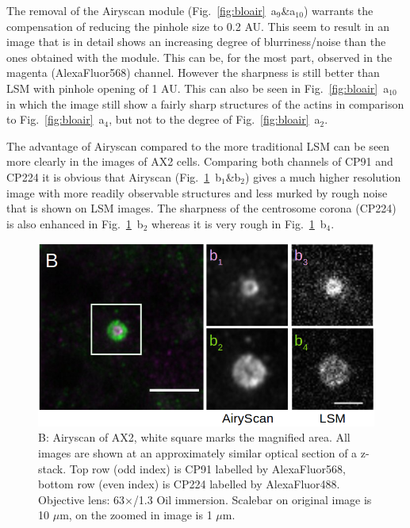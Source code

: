 The removal of the Airyscan module (Fig.~\ref{fig:bloair}~a$_{9}$\&a$_{10}$) warrants the compensation of reducing the pinhole size to 0.2 AU. 
This seem to result in an image that is in detail shows an increasing degree of blurriness/noise than the ones obtained with the module. 
This can be, for the most part, observed in the magenta (AlexaFluor568) channel. 
However the sharpness is still better than LSM with pinhole opening of 1 AU. 
This can also be seen in Fig.~\ref{fig:bloair}~a$_{10}$ in which the image still show a fairly sharp structures of the actins in comparison to Fig.~\ref{fig:bloair}~a$_{4}$, but not to the degree of Fig.~\ref{fig:bloair}~a$_{2}$.  

The advantage of Airyscan compared to the more traditional LSM can be seen more clearly in the images of AX2 cells. 
Comparing both channels of CP91 and CP224 it is obvious that Airyscan (Fig.~\ref{fig:dicair}~b$_{1}$\&b$_{2}$) gives a much higher resolution image with more readily observable structures and less murked by rough noise that is shown on LSM images. 
The sharpness of the centrosome corona (CP224) is also enhanced in Fig.~\ref{fig:dicair}~b$_{2}$ whereas it is very rough in Fig.~\ref{fig:dicair}~b$_{4}$.

\begin{figure}[h!]
\centering
\includegraphics[width=.9\columnwidth]{Exp_6_Airyscan/Figures/DictSl}
\caption{B: Airyscan of AX2, white square marks the magnified area. 
All images are shown at an approximately similar optical section of a z-stack. 
Top row (odd index) is CP91 labelled by AlexaFluor568, bottom row (even index) is CP224 labelled by AlexaFluor488. 
Objective lens: 63$\times$/1.3 Oil immersion. 
Scalebar on original image is 10 $\mu$m, on the zoomed in image is 1 $\mu$m.} 
\label{fig:dicair}
\end{figure}



\renewcommand{\refname}{\spacedlowsmallcaps{References}} %

%

